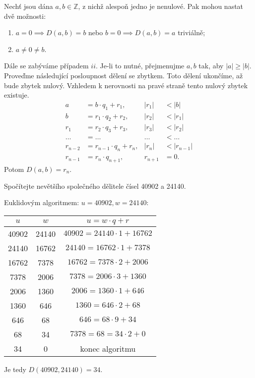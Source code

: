 \begin{definition}\label{eukliduvalg}
Nechť jsou dána $a,b \in \mathbb Z$, z nichž alespoň jedno je nenulové. Pak mohou nastat dvě možnosti:
\begin{enumerate}[$i.$]
  \item $a = 0 \implies D(a, b) = b$ nebo $b=0 \implies D(a,b)=a$ triviálně;
  \item $a \ne 0 \ne b$.
\end{enumerate}
Dále se zabýváme případem $ii$. Je-li to nutné, přejmenujme $a,b$ tak, aby $|a|\geq |b|$.
Proveďme následující posloupnost dělení se zbytkem. Toto dělení ukončíme, až bude zbytek nulový.
Vzhledem k nerovnosti na pravé straně tento nulový zbytek existuje.
\begin{align*}
  a & = b \cdot q_1 + r_1,  & |r_1| & < |b| \\
  b & = r_1 \cdot q_2 + r_2, & |r_2| & < |r_1| \\
  r_1 & = r_2 \cdot q_3 + r_3, & |r_3| & < |r_2|\\
  \dots & = \dots & \dots & < \dots\\
  r_{n-2} & = r_{n-1} \cdot q_n + r_n, & |r_n| & < |r_{n-1}| \\
  r_{n-1} & = r_{n} \cdot q_{n+1}, & r_{n+1} & = 0.
\end{align*}
Potom $D(a,b) = r_n$.
\end{definition}

\begin{priklad}
  Spočítejte nevětšího společného dělitele čísel 40902 a 24140.
\end{priklad}

\begin{reseni}
  Euklidovým algoritmem: $u = 40902, w = 24140:$
  \begin{center}
    \begin{tabular}{c | c | c}
      $u$ & $w$ & $u=w\cdot q+r$  \\
      \hline
      40902 & 24140 & $40902 = 24140\cdot1 + 16762$ \\
      24140 & 16762 & $24140 = 16762\cdot1 + 7378$ \\
      16762 & 7378 & $16762 = 7378\cdot2 + 2006$  \\
      7378 & 2006 & $7378 = 2006\cdot3 + 1360$  \\
      2006 & 1360 & $2006 = 1360\cdot1 + 646$  \\
      1360 & 646 & $1360 = 646\cdot2 + 68$  \\
      646 & 68 & $646 = 68\cdot9 + 34$  \\
      68 & 34 & $7378 = 68 = 34\cdot2 + 0$  \\
      34 & 0 & konec algoritmu  \\
    \end{tabular}
  \end{center}
  Je tedy $D(40902, 24140) = 34$.
\end{reseni}


